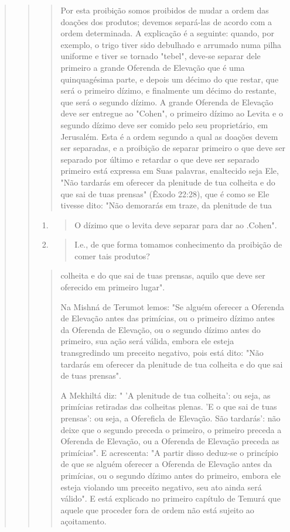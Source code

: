 \begin{quote}
\begin{quote}
\begin{quote}
Por esta proibição somos proibidos de mudar a ordem das doações dos
produtos; devemos separá-las de acordo com a ordem determinada. A
ex­plicação é a seguinte: quando, por exemplo, o trigo tiver sido
debulhado e ar­rumado numa pilha uniforme e tiver se tornado "tebel",
deve-se separar dele primeiro a grande Oferenda de Elevação que é uma
quinquagésima parte, e de­pois um décimo do que restar, que será o
primeiro dízimo, e finalmente um décimo do restante, que será o segundo
dízimo. A grande Oferenda de Eleva­ção deve ser entregue ao "Cohen", o
primeiro dízimo ao Levita e o segundo dízimo deve ser comido pelo seu
proprietário, em Jerusalém. Esta é a ordem segundo a qual as doações
devem ser separadas, e a proibição de separar pri­meiro o que deve ser
separado por último e retardar o que deve ser separado primeiro está
expressa em Suas palavras, enaltecido seja Ele, "Não tardarás em
oferecer da plenitude de tua colheita e do que sai de tuas prensas"
(Êxodo 22:28), que é como se Ele tivesse dito: "Não demorarás em traze,
da plenitude de tua
\end{quote}

\begin{enumerate}
\def\labelenumi{\arabic{enumi}.}
\setcounter{enumi}{317}
\item
 \begin{quote}
 O dízimo que o levita deve separar para dar ao
 .Cohen".
 \end{quote}
\item
 \begin{quote}
 I.e., de que forma tomamos conhecimento da proibição de comer tais
 produtos?
 \end{quote}
\end{enumerate}

\begin{quote}colheita e do que sai de tuas prensas, aquilo que deve ser oferecido em
primei­ro lugar".

Na Mishná de Terumot lemos: "Se alguém oferecer a Oferenda de Elevação
antes das primícias, ou o primeiro dízimo antes da Oferenda de
Eleva­ção, ou o segundo dízimo antes do primeiro, sua ação será válida,
embora ele esteja transgredindo um preceito negativo, pois está dito:
"Não tardarás em ofe­recer da plenitude de tua colheita e do que sai de
tuas prensas".

A Mekhiltá diz: " 'A plenitude de tua colheita': ou seja, as primícias
retiradas das colheitas plenas. 'E o que sai de tuas prensas': ou seja,
a Ofereficla de Elevação. São tardarás': não deixe que o segundo preceda
o primeiro, o primeiro preceda a Oferenda de Elevação, ou a Oferenda de
Elevação preceda as primícias". E acrescenta: "A partir disso deduz-se o
princípio de que se al­guém oferecer a Oferenda de Elevação antes da
primícias, ou o segundo dízi­mo antes do primeiro, embora ele esteja
violando um preceito negativo, seu ato ainda será válido". E está
explicado no primeiro capítulo de Temurá que aquele que proceder fora de
ordem não está sujeito ao açoitamento.


\end{quote}
\end{quote}
\end{quote}

